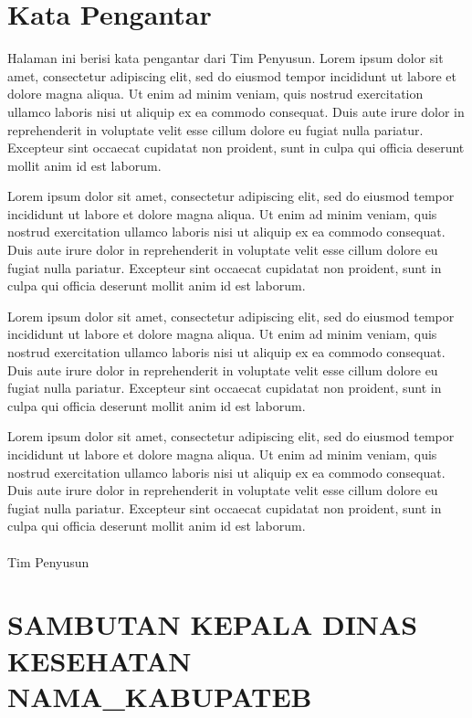 \clearpage{}
{}
\section*{Kata Pengantar}

Halaman ini berisi kata pengantar dari Tim Penyusun. Lorem ipsum dolor sit amet, consectetur adipiscing elit, sed do eiusmod tempor incididunt ut labore et dolore magna aliqua. Ut enim ad minim veniam, quis nostrud exercitation ullamco laboris nisi ut aliquip ex ea commodo consequat. Duis aute irure dolor in reprehenderit in voluptate velit esse cillum dolore eu fugiat nulla pariatur. Excepteur sint occaecat cupidatat non proident, sunt in culpa qui officia deserunt mollit anim id est laborum.

Lorem ipsum dolor sit amet, consectetur adipiscing elit, sed do eiusmod tempor incididunt ut labore et dolore magna aliqua. Ut enim ad minim veniam, quis nostrud exercitation ullamco laboris nisi ut aliquip ex ea commodo consequat. Duis aute irure dolor in reprehenderit in voluptate velit esse cillum dolore eu fugiat nulla pariatur. Excepteur sint occaecat cupidatat non proident, sunt in culpa qui officia deserunt mollit anim id est laborum.

Lorem ipsum dolor sit amet, consectetur adipiscing elit, sed do eiusmod tempor incididunt ut labore et dolore magna aliqua. Ut enim ad minim veniam, quis nostrud exercitation ullamco laboris nisi ut aliquip ex ea commodo consequat. Duis aute irure dolor in reprehenderit in voluptate velit esse cillum dolore eu fugiat nulla pariatur. Excepteur sint occaecat cupidatat non proident, sunt in culpa qui officia deserunt mollit anim id est laborum.

Lorem ipsum dolor sit amet, consectetur adipiscing elit, sed do eiusmod tempor incididunt ut labore et dolore magna aliqua. Ut enim ad minim veniam, quis nostrud exercitation ullamco laboris nisi ut aliquip ex ea commodo consequat. Duis aute irure dolor in reprehenderit in voluptate velit esse cillum dolore eu fugiat nulla pariatur. Excepteur sint occaecat cupidatat non proident, sunt in culpa qui officia deserunt mollit anim id est laborum.\\
\\
Tim Penyusun

\clearpage{}

{}
\section*{SAMBUTAN KEPALA DINAS KESEHATAN NAMA_KABUPATEB}

